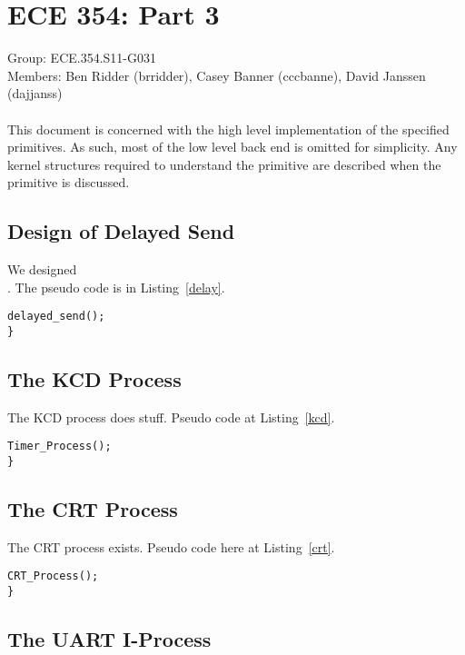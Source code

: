 \documentclass[oneside]{article}
\begin{document}
\lstset{language=C, 
        frame=single, 
        breaklines=true,
        basicstyle=\small\ttfamily,
        columns=fullflexible}
\section*{ECE 354: Part 3}
Group: ECE.354.S11-G031 \\
Members: Ben Ridder (brridder), Casey Banner (cccbanne), 
David Janssen (dajjanss) \\ \\
This document is concerned with the high level implementation of the 
specified primitives. As such, most of the low level back end is omitted for
simplicity. Any kernel structures required to understand the primitive are
described when the primitive is discussed.

\subsection*{Design of Delayed Send} 
We designed \\. The pseudo code is in Listing~\ref{delay}.

\begin{lstlisting}
delayed_send();
}
\end{lstlisting}

\subsection*{The KCD Process}
The KCD process does stuff. Pseudo code at Listing~\ref{kcd}. 

\begin{lstlisting}
Timer_Process();
}
\end{lstlisting}

\subsection*{The CRT Process}

The CRT process exists. Pseudo code here at Listing~\ref{crt}.

\begin{lstlisting}
CRT_Process();
}
\end{lstlisting}

\subsection*{The UART I-Process}
\end{document}
